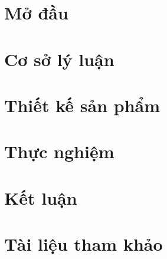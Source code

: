 \documentclass[a4paper,12pt]{report}
\begin{document}



\tableofcontents
\thispagestyle{empty}
\newpage\setcounter{page}{1}

\chapter*{Mở đầu}

\chapter{Cơ sở lý luận}
\chapter{Thiết kế sản phẩm}
\chapter{Thực nghiệm}
\chapter*{Kết luận}
\chapter*{Tài liệu tham khảo}
\end{document}
